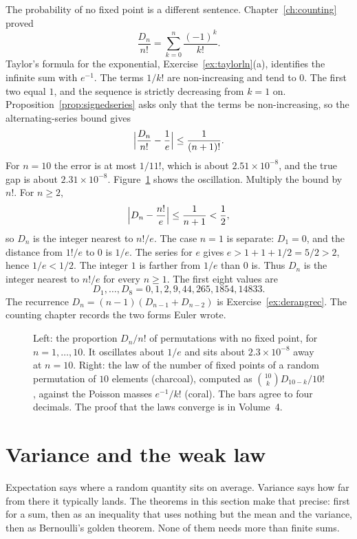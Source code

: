 The probability of no fixed point is a different sentence. Chapter~\ref{ch:counting} proved
\[
 \frac{D_n}{n!}=\sum_{k=0}^n\frac{(-1)^k}{k!}.
\]
Taylor's formula for the exponential, Exercise~\ref{ex:taylorln}(a), identifies the infinite sum with $e^{-1}$. The terms $1/k!$ are non-increasing and tend to $0$. The first two equal $1$, and the sequence is strictly decreasing from $k=1$ on. Proposition~\ref{prop:signedseries} asks only that the terms be non-increasing, so the alternating-series bound gives
\[
 \Bigl|\frac{D_n}{n!}-\frac1e\Bigr|\le\frac1{(n+1)!}.
\]
For $n=10$ the error is at most $1/11!$, which is about $2.51\times10^{-8}$, and the true gap is about $2.31\times10^{-8}$. Figure~\ref{fig:derang} shows the oscillation. Multiply the bound by $n!$. For $n\ge2$,
\[
 \Bigl|D_n-\frac{n!}{e}\Bigr|\le\frac1{n+1}<\frac12,
\]
so $D_n$ is the integer nearest to $n!/e$. The case $n=1$ is separate: $D_1=0$, and the distance from $1!/e$ to $0$ is $1/e$. The series for $e$ gives $e>1+1+1/2=5/2>2$, hence $1/e<1/2$. The integer $1$ is farther from $1/e$ than $0$ is. Thus $D_n$ is the integer nearest to $n!/e$ for every $n\ge1$. The first eight values are
\[
 D_1,\ldots,D_8=0,1,2,9,44,265,1854,14833.
\]
The recurrence $D_n=(n-1)(D_{n-1}+D_{n-2})$ is Exercise~\ref{ex:derangrec}. The counting chapter records the two forms Euler wrote.

\begin{figure}[ht]
\centering
{}
\caption{Left: the proportion $D_n/n!$ of permutations with no fixed point, for $n=1,\ldots,10$. It oscillates about $1/e$ and sits about $2.3\times10^{-8}$ away at $n=10$. Right: the law of the number of fixed points of a random permutation of $10$ elements (charcoal), computed as $\binom{10}{k}D_{10-k}/10!$, against the Poisson masses $e^{-1}/k!$ (coral). The bars agree to four decimals. The proof that the laws converge is in Volume~4.}
\label{fig:derang}
\end{figure}

\section{Variance and the weak law}

Expectation says where a random quantity sits on average. Variance says how far from there it typically lands. The theorems in this section make that precise: first for a sum, then as an inequality that uses nothing but the mean and the variance, then as Bernoulli's golden theorem. None of them needs more than finite sums.

